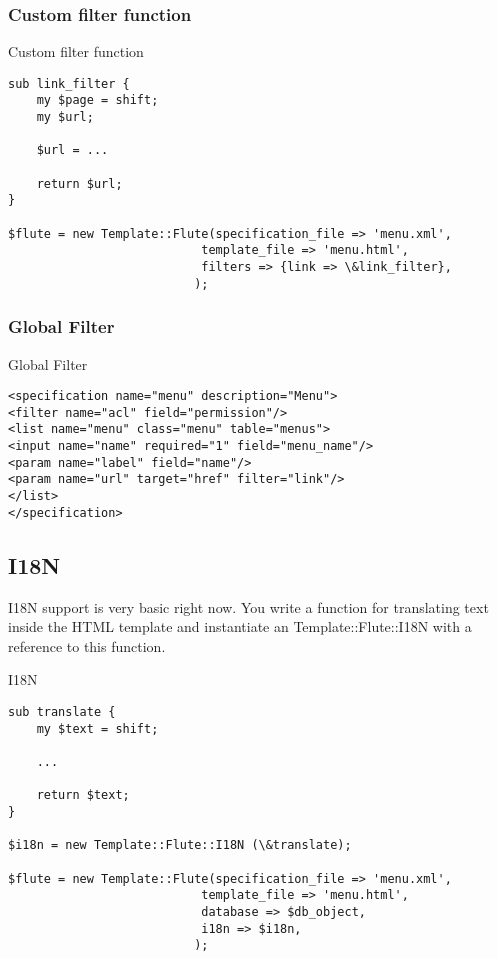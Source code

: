 \subsubsection{Custom filter function}
\begin{frame}[fragile]{Custom filter function}
\begin{lstlisting}
sub link_filter {
    my $page = shift;
    my $url;

    $url = ...
    
    return $url;
}

$flute = new Template::Flute(specification_file => 'menu.xml',
						   template_file => 'menu.html',
						   filters => {link => \&link_filter},
						  );
\end{lstlisting}
\end{frame}

\subsubsection{Global Filter}
\begin{frame}[fragile]{Global Filter}
\begin{lstlisting}
<specification name="menu" description="Menu">
<filter name="acl" field="permission"/>
<list name="menu" class="menu" table="menus">
<input name="name" required="1" field="menu_name"/>
<param name="label" field="name"/>
<param name="url" target="href" filter="link"/>
</list>
</specification>
\end{lstlisting}
\end{frame}

\subsection{I18N}
I18N support is very basic right now. You write a function for
translating text inside the HTML template and instantiate an
Template::Flute::I18N with a reference to this function. 
\begin{frame}[fragile]{I18N}
\begin{lstlisting}
sub translate {
    my $text = shift;

    ...

    return $text;
}

$i18n = new Template::Flute::I18N (\&translate);

$flute = new Template::Flute(specification_file => 'menu.xml',
						   template_file => 'menu.html',
						   database => $db_object,
						   i18n => $i18n,
						  );
\end{lstlisting}
\end{frame}

